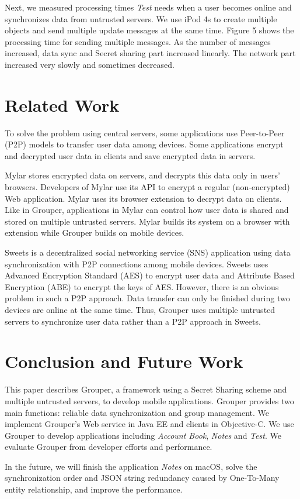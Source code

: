 \documentclass[twocolumn,10pt]{article}
\begin{document}
Next, we measured processing times \emph{Test} needs when a user becomes online and synchronizes data from untrusted servers.
We use iPod 4s to create multiple objects and send multiple update messages at the same time.
Figure 5 shows the processing time for sending multiple messages. 
As the number of messages increased, data sync and Secret sharing part increased linearly. 
The network part increased very slowly and sometimes decreased.

\section{Related Work}

To solve the problem using central servers, some applications use Peer-to-Peer (P2P) models to transfer user data among devices. 
Some applications encrypt and decrypted user data in clients and save encrypted data in servers. 

Mylar\cite{popa2014building} stores encrypted data on servers, and decrypts this data only in users’ browsers. 
Developers of Mylar use its API to encrypt a regular (non-encrypted) Web application. 
Mylar uses its browser extension to decrypt data on clients. 
Like in Grouper, applications in Mylar can control how user data is shared and stored on multiple untrusted servers. 
Mylar builds its system on a browser with extension while Grouper builds on mobile devices.

Sweets\cite{sweets} is a decentralized social networking service (SNS) application using data synchronization with P2P connections among mobile devices. 
Sweets uses Advanced Encryption Standard (AES) to encrypt user data and Attribute Based Encryption (ABE) to encrypt the keys of AES. 
However, there is an obvious problem in such a P2P approach. 
Data transfer can only be finished during two devices are online at the same time. 
Thus, Grouper uses multiple untrusted servers to synchronize user data rather than a P2P approach in Sweets.

\section{Conclusion and Future Work}

This paper describes Grouper, a framework using a Secret Sharing scheme and multiple untrusted servers, to develop mobile applications.
Grouper provides two main functions: reliable data synchronization and group management. 
We implement Grouper's Web service in Java EE and clients in Objective-C. 
We use Grouper to develop applications including \emph{Account Book}, \emph{Notes} and \emph{Test}. 
We evaluate Grouper from developer efforts and performance. 

In the future, we will finish the application \emph{Notes} on macOS, solve the synchronization order and JSON string redundancy caused by One-To-Many entity relationship, and improve the performance.


{
	\footnotesize
	
}
\end{document}
